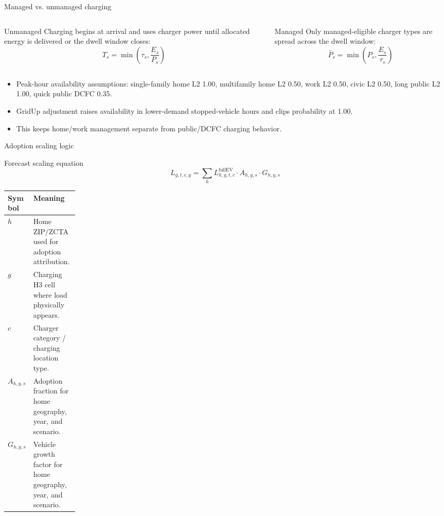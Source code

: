 \documentclass[aspectratio=169]{beamer}
\begin{document}
\begin{frame}{Managed vs. unmanaged charging}
\footnotesize
\begin{columns}[T,totalwidth=\linewidth]
\begin{column}{0.48\linewidth}
\begin{block}{Unmanaged}
Charging begins at arrival and uses charger power until allocated energy is delivered or the dwell window closes:
\[
T_s = \min\left(\tau_s, \frac{E_s}{P_s}\right)
\]
\end{block}
\end{column}
\begin{column}{0.48\linewidth}
\begin{block}{Managed}
Only managed-eligible charger types are spread across the dwell window:
\[
\bar{P}_s = \min\left(P_s, \frac{E_s}{\tau_s}\right)
\]
\end{block}
\end{column}
\end{columns}

\vspace{0.3em}
\begin{itemize}
  \item Peak-hour availability assumptions: single-family home L2 1.00, multifamily home L2 0.50, work L2 0.50, civic L2 0.50, long public L2 1.00, quick public DCFC 0.35.
  \item GridUp adjustment raises availability in lower-demand stopped-vehicle hours and clips probability at 1.00.
  \item This keeps home/work management separate from public/DCFC charging behavior.
\end{itemize}
\end{frame}

\begin{frame}{Adoption scaling logic}
\small
\begin{block}{Forecast scaling equation}
\[
L_{g,t,c,y} = \sum_h L^{\text{fullEV}}_{h,g,t,c}
\cdot A_{h,y,s} \cdot G_{h,y,s}
\]
\end{block}

\begin{tabularx}{\linewidth}{p{0.16\linewidth}Y}
\toprule
\textbf{Symbol} & \textbf{Meaning} \\
\midrule
$h$ & Home ZIP/ZCTA used for adoption attribution. \\
$g$ & Charging H3 cell where load physically appears. \\
$c$ & Charger category / charging location type. \\
$A_{h,y,s}$ & Adoption fraction for home geography, year, and scenario. \\
$G_{h,y,s}$ & Vehicle growth factor for home geography, year, and scenario. \\
\bottomrule
\end{tabularx}
\end{frame}
\end{document}
